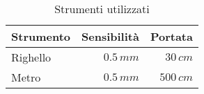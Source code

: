 \begin{table}[h!]
    \hspace{5mm}
    \begin{tabular}{|l|r|r|}
        \hline
        Strumento & Sensibilità & Portata\\
        \hline
        Righello   & $0.5\,mm$ & $30\,cm$\\
        \hline
        Metro   & $0.5\,mm$ & $500\,cm$\\
        \hline
    \end{tabular}
    \caption{Strumenti utilizzati}
    \label{strumenti}
\end{table}
